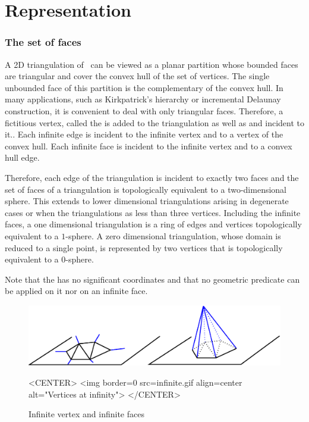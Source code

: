 \section{Representation}
\label{Section_2D_Triangulations_Representation}

\subsubsection{The set of faces}

A 2D triangulation  of \cgal\ can be viewed as a planar partition 
whose bounded faces are triangular and cover
the convex hull of the set of vertices. 
The single unbounded face of this partition
is the complementary of the convex hull. 
In many applications, such as Kirkpatrick's hierarchy
or incremental Delaunay construction, it is convenient to
deal with only triangular faces. Therefore, 
a fictitious vertex, called the 
is added to the triangulation as well as
 and  incident to it..
Each infinite edge
is incident to the infinite vertex and to a vertex of the convex hull.
Each infinite face is incident to the infinite vertex
and to a convex hull edge. 

Therefore, each edge of the triangulation
is incident to exactly two faces
and the set of faces of a triangulation is topologically
equivalent to a two-dimensional sphere.
This extends to  lower dimensional triangulations
arising in degenerate cases or when the triangulations
as less than three vertices.
Including the infinite faces, 
a one dimensional triangulation
is a ring of edges and vertices
topologically equivalent to a $1$-sphere.
A zero dimensional triangulation, whose domain is reduced to a
single point, is represented by  two vertices that is
topologically equivalent to a $0$-sphere.

Note that
the  has no significant
coordinates and that no geometric predicate can be applied on it
nor on an infinite face.

\begin{figure}
\begin{ccTexOnly}
\begin{center}
\includegraphics{infinite.eps} 
\end{center}
\end{ccTexOnly}
\caption{Infinite vertex and infinite faces
\label{2D_Triangulation_Fig_infinite_vertex}}
\begin{ccHtmlOnly}
<CENTER>
<img border=0 src=infinite.gif align=center alt="Vertices at
infinity">
</CENTER>
\end{ccHtmlOnly}
\end{figure}




